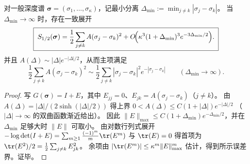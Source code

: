 %

\begin{proposition}\label{prop:xi-hellinger-cluster-expansion-large-separation}
对一般深度谱 \(\boldsymbol{\sigma}=(\sigma_1,\dots,\sigma_\kappa)\)，记最小分离
\(
\Delta_{\min}:=\min_{j\neq k}|\sigma_j-\sigma_k|
\)。
当 \(\Delta_{\min}\to\infty\) 时，存在一致展开
\[
\boxed{\;
S_{1/2}(\boldsymbol{\sigma})
=\frac12\sum_{j\neq k}A(\sigma_j-\sigma_k)^{2}
+O\!\Bigl(\kappa^{3}(1+\Delta_{\min})^{3}e^{-3\Delta_{\min}/2}\Bigr).\;}
\]
并且
\(
A(\Delta)\sim |\Delta|e^{-|\Delta|/2}
\)，从而主项满足
\[
\frac12\sum_{j\neq k}A(\sigma_j-\sigma_k)^2
\sim \frac12\sum_{j\neq k}|\sigma_j-\sigma_k|^2e^{-|\sigma_j-\sigma_k|}
\qquad(\Delta_{\min}\to\infty).
\]
\end{proposition}
\begin{proof}
写 \(G(\boldsymbol{\sigma})=I+E\)，其中 \(E_{jj}=0\)、\(E_{jk}=A(\sigma_j-\sigma_k)\)（\(j\neq k\)）。
由 \(A(\Delta)=|\Delta|/(2\sinh(|\Delta|/2))\) 得上界
\(
0<A(\Delta)\le C(1+|\Delta|)e^{-|\Delta|/2}
\)
（\(|\Delta|\to\infty\) 的双曲函数渐近给出）。
因此 \(\|E\|_{\max}\le C(1+\Delta_{\min})e^{-\Delta_{\min}/2}\)，并在 \(\Delta_{\min}\) 足够大时 \(\|E\|\) 可取小。
由对数行列式展开
\(
-\log\det(I+E)=\sum_{m\ge 1}\frac{(-1)^m}{m}\tr(E^m)
\)
与 \(\tr(E)=0\) 得首项为 \(\tr(E^2)/2=\frac12\sum_{j\neq k}E_{jk}^2\)。
余项由 \(|\tr(E^m)|\le \kappa^m\|E\|_{\max}^m\) 估计，得到所示误差界。证毕。
\end{proof}

